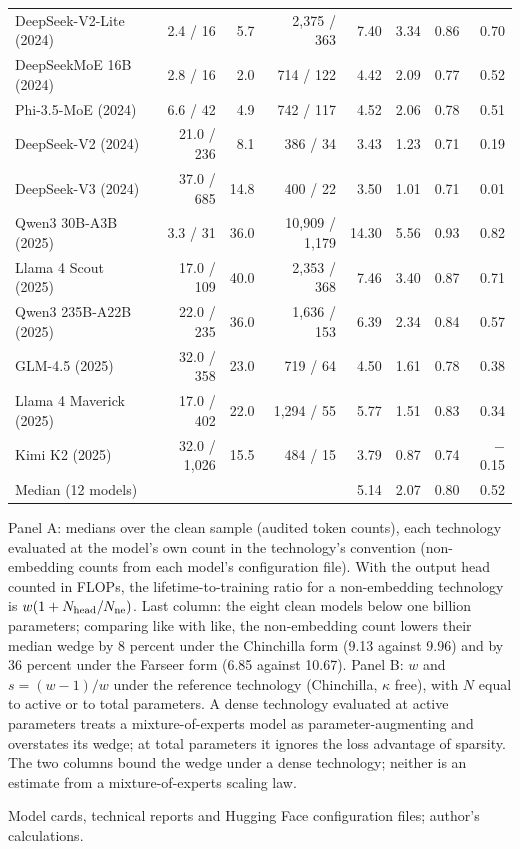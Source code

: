 \begin{table}[tp]
\begin{tabular*}{\textwidth}{@{\extracolsep{\fill}}lrrrrrrr@{}}
DeepSeek-V2-Lite (2024) & 2.4 / 16 & 5.7 & 2,375 / 363 & 7.40 & 3.34 & 0.86 & 0.70 \\
DeepSeekMoE 16B (2024) & 2.8 / 16 & 2.0 & 714 / 122 & 4.42 & 2.09 & 0.77 & 0.52 \\
Phi-3.5-MoE (2024) & 6.6 / 42 & 4.9 & 742 / 117 & 4.52 & 2.06 & 0.78 & 0.51 \\
DeepSeek-V2 (2024) & 21.0 / 236 & 8.1 & 386 / 34 & 3.43 & 1.23 & 0.71 & 0.19 \\
DeepSeek-V3 (2024) & 37.0 / 685 & 14.8 & 400 / 22 & 3.50 & 1.01 & 0.71 & 0.01 \\
Qwen3 30B-A3B (2025) & 3.3 / 31 & 36.0 & 10,909 / 1,179 & 14.30 & 5.56 & 0.93 & 0.82 \\
Llama 4 Scout (2025) & 17.0 / 109 & 40.0 & 2,353 / 368 & 7.46 & 3.40 & 0.87 & 0.71 \\
Qwen3 235B-A22B (2025) & 22.0 / 235 & 36.0 & 1,636 / 153 & 6.39 & 2.34 & 0.84 & 0.57 \\
GLM-4.5 (2025) & 32.0 / 358 & 23.0 & 719 / 64 & 4.50 & 1.61 & 0.78 & 0.38 \\
Llama 4 Maverick (2025) & 17.0 / 402 & 22.0 & 1,294 / 55 & 5.77 & 1.51 & 0.83 & 0.34 \\
Kimi K2 (2025) & 32.0 / 1,026 & 15.5 & 484 / 15 & 3.79 & 0.87 & 0.74 & $-$0.15 \\
\addlinespace
Median (12 models) & & & & 5.14 & 2.07 & 0.80 & 0.52 \\
\bottomrule
\end{tabular*}
\par\smallskip
\begin{tablenotes}
Panel A: medians over the clean sample (audited token counts), each technology evaluated at the model's own count in the
technology's convention (non-embedding counts from each model's configuration file). With the output head counted in
FLOPs, the lifetime-to-training ratio for a non-embedding technology is $w(1+N_{\rm head}/N_{\rm ne})$. Last column:
the eight clean models below one billion parameters; comparing like with like, the non-embedding count lowers their
median wedge by 8 percent under the Chinchilla form (9.13 against 9.96) and by 36 percent under the Farseer form (6.85
against 10.67). Panel B: $w$ and $s=(w-1)/w$ under the reference technology (Chinchilla, $\kappa$ free), with $N$ equal
to active or to total parameters. A dense technology evaluated at active parameters treats a mixture-of-experts model
as parameter-augmenting and overstates its wedge; at total parameters it ignores the loss advantage of sparsity. The
two columns bound the wedge under a dense technology; neither is an estimate from a mixture-of-experts scaling law.
\end{tablenotes}
\begin{tablenotes}[Source]
Model cards, technical reports and Hugging Face configuration files; author's calculations.
\end{tablenotes}
\end{table}
